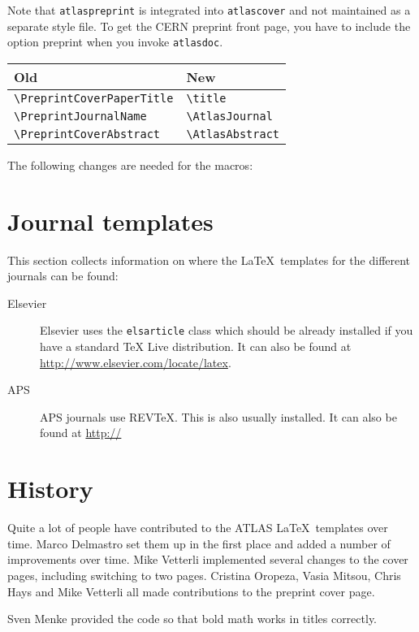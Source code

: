 \documentclass[koma,UKenglish]{style/atlasdoc}
\newcommand{\Macro}[1]{\texttt{\textbackslash #1}\xspace}
\newcommand{\Option}[1]{\textsf{#1}\xspace}
\newcommand{\Package}[1]{\texttt{#1}\xspace}
\begin{document}
Note that \texttt{atlaspreprint} is integrated into \texttt{atlascover} and not maintained as a separate style file.
To get the CERN preprint front page, you have to include the option \Option{preprint} when you invoke \Package{atlasdoc}.
\begin{center}
	\begin{tabular}{ll}
		Old                              & New                   \\
		\midrule
		\Macro{PreprintCoverPaperTitle} & \Macro{title}    \\
		\Macro{PreprintJournalName}     & \Macro{AtlasJournal}  \\
		\Macro{PreprintCoverAbstract}   & \Macro{AtlasAbstract}
	\end{tabular}
\end{center}
The following changes are needed for the macros:


\section{Journal templates}
\label{sec:journal}

This section collects information on where the \LaTeX\ templates for the different journals can be found:
\begin{description}
\item[Elsevier] Elsevier uses the \texttt{elsarticle} class which should be already installed if you have a standard 
	TeX Live distribution. 
	It can also be found at \url{http://www.elsevier.com/locate/latex}.
\item[APS] APS journals use REV\TeX. This is also usually installed.
	It can also be found at \url{http://} 
\end{description}

\section*{History}

Quite a lot of people have contributed to the ATLAS \LaTeX\ templates over time.
Marco Delmastro set them up in the first place and added a number of improvements over time.
Mike Vetterli implemented several changes to the cover pages, including switching to two pages.
Cristina Oropeza, Vasia Mitsou, Chris Hays and Mike Vetterli all made contributions to the preprint cover page.

Sven Menke provided the code so that bold math works in titles correctly.
\end{document}
